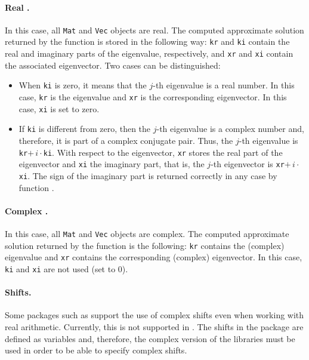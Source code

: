 \paragraph{Real \slepc.} In this case, all \texttt{Mat} and \texttt{Vec} objects are real. The computed approximate solution returned by the function  is stored in the following way: \texttt{kr} and \texttt{ki} contain the real and imaginary parts of the eigenvalue, respectively, and \texttt{xr} and \texttt{xi} contain the associated eigenvector. Two cases can be distinguished:

\begin{itemize}
\item	When \texttt{ki} is zero, it means that the $j$-th eigenvalue is a real number. In this case, \texttt{kr} is the eigenvalue and \texttt{xr} is the corresponding eigenvector. In this case, \texttt{xi} is set to zero.

\item	If \texttt{ki} is different from zero, then the $j$-th eigenvalue is a complex number and, therefore, it is part of a complex conjugate pair. Thus, the $j$-th eigenvalue is \texttt{kr}$+\,i\cdot$\texttt{ki}.
With respect to the eigenvector, \texttt{xr} stores the real part of the eigenvector and \texttt{xi} the imaginary part, that is, the $j$-th eigenvector is \texttt{xr}$+\,i\cdot$\texttt{xi}. The sign of the imaginary part is returned correctly in any case by function .
\end{itemize}

\paragraph{Complex \slepc.} In this case, all \texttt{Mat} and \texttt{Vec} objects are complex. The computed approximate solution returned by the function  is the following: \texttt{kr} contains the (complex) eigenvalue and \texttt{xr} contains the corresponding (complex) eigenvector. In this case, \texttt{ki} and \texttt{xi} are not used (set to 0).

\paragraph{Shifts.} Some packages such as \arpack{} support the use of complex shifts even when working with real arithmetic. Currently, this is not supported in \slepc. The shifts in the  package are defined as  variables and, therefore, the complex version of the libraries must be used in order to be able to specify complex shifts.

